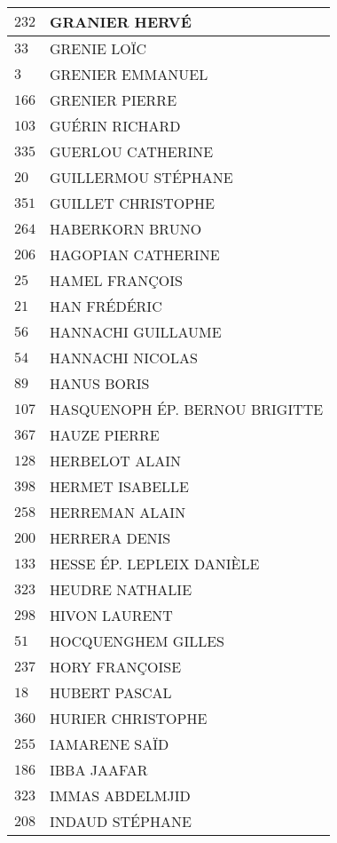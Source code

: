 \begin{xltabular}{\linewidth}{|l|X|}
    \hline
    $232$ & GRANIER HERVÉ \\
    \hline
    $33$ & GRENIE LOÏC \\
    \hline
    $3$ & GRENIER EMMANUEL \\
    \hline
    $166$ & GRENIER PIERRE \\
    \hline
    $103$ & GUÉRIN RICHARD \\
    \hline
    $335$ & GUERLOU CATHERINE \\
    \hline
    $20$ & GUILLERMOU STÉPHANE \\
    \hline
    $351$ & GUILLET CHRISTOPHE \\
    \hline
    $264$ & HABERKORN BRUNO \\
    \hline
    $206$ & HAGOPIAN CATHERINE \\
    \hline
    $25$ & HAMEL FRANÇOIS \\
    \hline
    $21$ & HAN FRÉDÉRIC \\
    \hline
    $56$ & HANNACHI GUILLAUME \\
    \hline
    $54$ & HANNACHI NICOLAS \\
    \hline
    $89$ & HANUS BORIS \\
    \hline
    $107$ & HASQUENOPH ÉP. BERNOU BRIGITTE \\
    \hline
    $367$ & HAUZE PIERRE \\
    \hline
    $128$ & HERBELOT ALAIN \\
    \hline
    $398$ & HERMET ISABELLE \\
    \hline
    $258$ & HERREMAN ALAIN \\
    \hline
    $200$ & HERRERA DENIS \\
    \hline
    $133$ & HESSE ÉP. LEPLEIX DANIÈLE \\
    \hline
    $323$ & HEUDRE NATHALIE \\
    \hline
    $298$ & HIVON LAURENT \\
    \hline
    $51$ & HOCQUENGHEM GILLES \\
    \hline
    $237$ & HORY FRANÇOISE \\
    \hline
    $18$ & HUBERT PASCAL \\
    \hline
    $360$ & HURIER CHRISTOPHE \\
    \hline
    $255$ & IAMARENE SAÏD \\
    \hline
    $186$ & IBBA JAAFAR \\
    \hline
    $323$ & IMMAS ABDELMJID \\
    \hline
    $208$ & INDAUD STÉPHANE \\

\end{xltabular}
